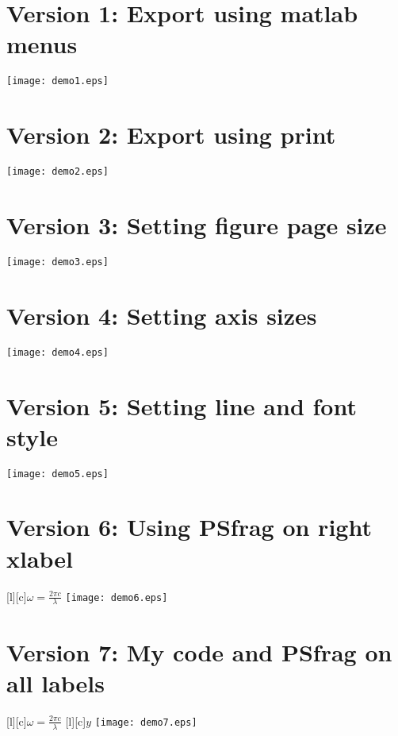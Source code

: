 \documentclass{article} %
\begin{document}
\section*{Version 1: Export using matlab menus}
\begin{center}
\texttt{[image: demo1.eps]}
\end{center}
\pagebreak

\section*{Version 2: Export using print}
\begin{center}
\texttt{[image: demo2.eps]}
\end{center}
\pagebreak

\section*{Version 3: Setting figure page size}
\begin{center}
\texttt{[image: demo3.eps]}
\end{center}
\pagebreak

\section*{Version 4: Setting axis sizes}
\begin{center}
\texttt{[image: demo4.eps]}
\end{center}
\pagebreak

\section*{Version 5: Setting line and font style}
\begin{center}
\texttt{[image: demo5.eps]}
\end{center}
\pagebreak

\section*{Version 6: Using PSfrag on right xlabel}
\begin{center}
[l][c]{$\omega = \frac{2 \pi c}{\lambda}$}
\texttt{[image: demo6.eps]}
\end{center}
\pagebreak

\section*{Version 7: My code and PSfrag on all labels}
\begin{center}
[l][c]{$\omega = \frac{2 \pi c}{\lambda}$}
[l][c]{$y$}
\texttt{[image: demo7.eps]}
\end{center}
\end{document}
